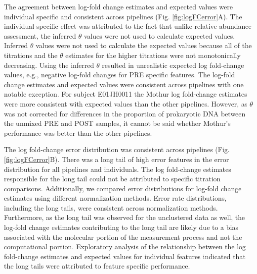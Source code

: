 \documentclass{bmcart}
\begin{document}
The agreement between log-fold change estimates and expected values were
individual specific and consistent across pipelines (Fig.
\ref{fig:logFCerror}A). The individual specific effect was attributed to
the fact that unlike relative abundance assessment, the inferred
\(\theta\) values were not used to calculate expected values. Inferred
\(\theta\) values were not used to calculate the expected values because
all of the titrations and the \(\theta\) estimates for the higher
titrations were not monotonically decreasing.
Using the inferred \(\theta\) resulted in unrealistic expected log fold-change values, e.g.,
negative log-fold changes for PRE specific features. The log-fold change
estimates and expected values were consistent across pipelines with one
notable exception. For subject E01JH0011 the Mothur log fold-change estimates
were more consistent with expected values than the other pipelines.
However, as \(\theta\) was not corrected for differences in the
proportion of prokaryotic DNA between the unmixed PRE and POST samples,
it cannot be said whether Mothur's performance was better than the other
pipelines.


The log fold-change error distribution was consistent across pipelines
(Fig. \ref{fig:logFCerror}B). There was a long tail of high error
features in the error distribution for all pipelines and individuals.
The log fold-change estimates responsible for the long tail could not be
attributed to specific titration comparisons. Additionally, we compared
error distributions for log-fold change estimates using
different normalization methods. Error rate distributions, including the
long tails, were consistent across normalization methods. Furthermore,
as the long tail was observed for the unclustered data as well, the
log-fold change estimates contributing to the long tail are likely due
to a bias associated with the molecular portion of the
measurement process and not the computational portion. Exploratory
analysis of the relationship between the log fold-change estimates and
expected values for individual features indicated that the long tails
were attributed to feature specific performance.
\end{document}
